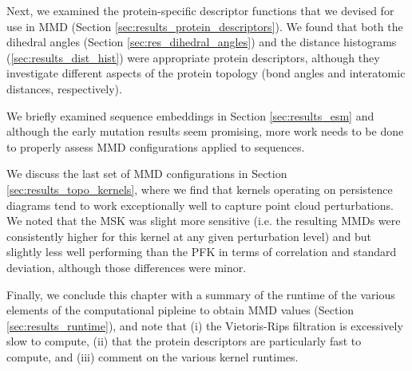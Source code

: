 Next, we examined the protein-specific descriptor functions that we devised for
use in MMD (Section \ref{sec:results_protein_descriptors}). We found that both
the dihedral angles (Section \ref{sec:res_dihedral_angles}) and the distance
histograms (\ref{sec:results_dist_hist}) were appropriate protein descriptors,
although they investigate different aspects of the protein topology (bond angles
and interatomic distances, respectively).

We briefly examined sequence embeddings in Section \ref{sec:results_esm} and
although the early mutation results seem promising, more work needs to be done
to properly assess MMD configurations applied to sequences.

We discuss the last set of MMD configurations in Section
\ref{sec:results_topo_kernels}, where we find that kernels operating on
persistence diagrams tend to work exceptionally well to capture point cloud
perturbations. We noted that the MSK was slight more sensitive (i.e. the
resulting MMDs were consistently higher for this kernel at any given
perturbation level) and but slightly less well performing than the PFK in terms
of correlation and standard deviation, although those differences were minor.

Finally, we conclude this chapter with a summary of the runtime of the various
elements of the computational pipleine to obtain MMD values (Section
\ref{sec:results_runtime}), and note that (i) the Vietoris-Rips filtration is
excessively slow to compute, (ii) that the protein descriptors are particularly
fast to compute, and (iii) comment on the various kernel runtimes.

